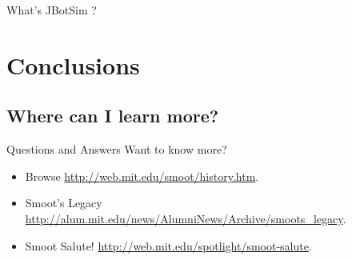 \documentclass{beamer}
\begin{document}
\begin{frame}{What's JBotSim ?}

\end{frame}

\section{Conclusions}
\subsection{Where can I learn more?}
\begin{frame}{Questions and Answers}
  Want to know more?

  \begin{itemize}
    \item Browse \url{http://web.mit.edu/smoot/history.htm}.
    \item Smoot's Legacy \url{http://alum.mit.edu/news/AlumniNews/Archive/smoots_legacy}.
    \item Smoot Salute! \url{http://web.mit.edu/spotlight/smoot-salute}.
  \end{itemize}
  
\end{frame}
\end{document}
